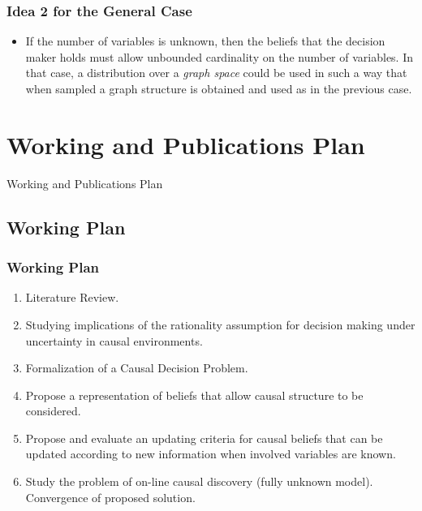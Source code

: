 \documentclass{beamer}
\theoremstyle{plain}
\begin{document}
\begin{frame}
\frametitle{Idea 2 for the General Case}
\begin{itemize}
\item If the number of variables is unknown, then the beliefs that the decision maker holds must allow unbounded cardinality on the number of variables. In that case, a distribution over a \textit{graph space} could be used in such a way that when sampled a graph structure is obtained and used as in the previous case.  
\end{itemize}
\end{frame}

\section{Working and Publications Plan}
\begin{frame}
Working and Publications Plan
\end{frame}
\subsection{Working Plan}
\begin{frame}
\frametitle{Working Plan}
\begin{enumerate}
\item Literature Review.
\item Studying implications of the rationality assumption for decision making under uncertainty in causal environments.
\item Formalization of a Causal Decision Problem.
\item Propose a representation of beliefs that allow causal structure to be considered.
\item Propose and evaluate an updating criteria for causal beliefs that can be updated according to new information when involved variables are known.
\item Study the problem of on-line causal discovery (fully unknown model). Convergence of proposed solution.
\end{enumerate}
\end{frame}
\end{document}
